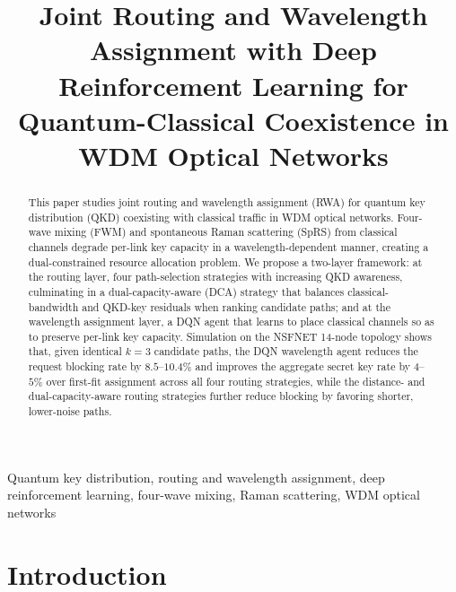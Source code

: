 \documentclass[conference]{IEEEtran}
\begin{document}
\title{Joint Routing and Wavelength Assignment with Deep Reinforcement Learning for Quantum-Classical Coexistence in WDM Optical Networks}

\author{
}

\maketitle

\begin{abstract}
This paper studies joint routing and wavelength assignment (RWA) for quantum key distribution (QKD) coexisting with classical traffic in WDM optical networks. Four-wave mixing (FWM) and spontaneous Raman scattering (SpRS) from classical channels degrade per-link key capacity in a wavelength-dependent manner, creating a dual-constrained resource allocation problem. We propose a two-layer framework: at the routing layer, four path-selection strategies with increasing QKD awareness, culminating in a dual-capacity-aware (DCA) strategy that balances classical-bandwidth and QKD-key residuals when ranking candidate paths; and at the wavelength assignment layer, a DQN agent that learns to place classical channels so as to preserve per-link key capacity. Simulation on the NSFNET 14-node topology shows that, given identical $k=3$ candidate paths, the DQN wavelength agent reduces the request blocking rate by $8.5$--$10.4\%$ and improves the aggregate secret key rate by $4$--$5\%$ over first-fit assignment across all four routing strategies, while the distance- and dual-capacity-aware routing strategies further reduce blocking by favoring shorter, lower-noise paths.
\end{abstract}

\begin{IEEEkeywords}
Quantum key distribution, routing and wavelength assignment, deep reinforcement learning, four-wave mixing, Raman scattering, WDM optical networks
\end{IEEEkeywords}

\section{Introduction}
\end{document}
